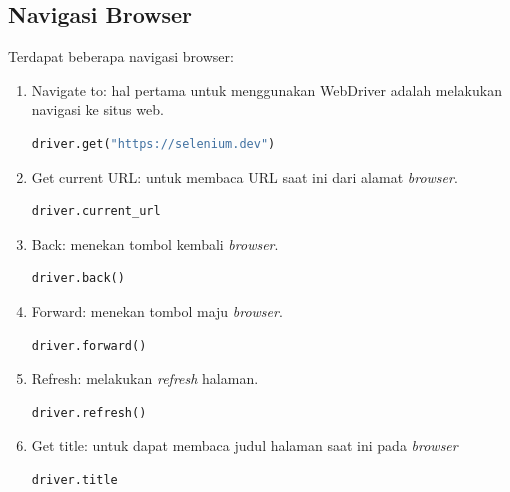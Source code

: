 \subsection{Navigasi Browser}
Terdapat beberapa navigasi browser:
\begin{enumerate}
	\item Navigate to: hal pertama untuk menggunakan WebDriver adalah melakukan navigasi ke situs web.
	\begin{lstlisting}[language=python, caption=Contoh kode Navigate to, label=kode:2:navigate]
		driver.get("https://selenium.dev")
	\end{lstlisting}
	\item Get current URL: untuk membaca URL saat ini dari alamat \textit{browser}.
	\begin{lstlisting}[language=python, caption=Contoh kode Get current URL, label=kode:2:current]
		driver.current_url
	\end{lstlisting}
	\item Back: menekan tombol kembali \textit{browser}.
	\begin{lstlisting}[language=python, caption=Contoh kode Back, label=kode:2:back]
		driver.back()
	\end{lstlisting}
	\item Forward: menekan tombol maju \textit{browser}.
	\begin{lstlisting}[language=python, caption=Contoh kode Forward, label=kode:2:forward]
		driver.forward()
	\end{lstlisting}
	\item Refresh: melakukan \textit{refresh} halaman.
	\begin{lstlisting}[language=python, caption=Contoh kode Refresh, label=kode:2:refresh]
		driver.refresh()
	\end{lstlisting}
	\item Get title: untuk dapat membaca judul halaman saat ini pada \textit{browser}
	\begin{lstlisting}[language=python, caption=Contoh kode Get title, label=kode:2:title]
		driver.title
	\end{lstlisting}
\end{enumerate}

